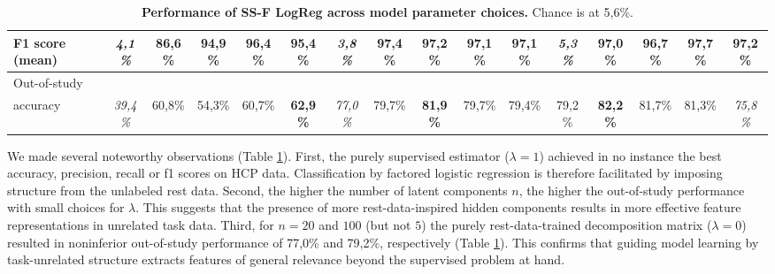 \documentclass{article} %
\begin{document}
\begin{table}[h]
{\begin{tabular}{l|ccccc|ccccc|ccccc}
  F1 score (mean)           & \textit{4,1\%}                     & 86,6\%                             & 94,9\%                            & \textbf{96,4\%}                    & 95,4\%                           & \textit{3,8\%}                   & \textbf{97,4\%}                      & 97,2\%                              & 97,1\%                               & 97,1\%                             & \textit{5,3\%}   & 97,0\%           & 96,7\%           & \textbf{97,7\%}  & 97,2\%                             \\ \hline
  Out-of-study\\accuracy    & \textit{39,4\%}                    & 60,8\%                             & 54,3\%                            & 60,7\%                             & \textbf{62,9\%}                  & \textit{77,0\%}                  & 79,7\%                               & \textbf{81,9\%}                     & 79,7\%                               & 79,4\%                             & 79,2\%           & \textbf{82,2\%}  & 81,7\%           & 81,3\%           & \textit{75,8\%}                    \\ \hline
  \end{tabular}
}
\vspace{-0.2cm}
 \caption{\textbf{Performance of SS-F LogReg across model parameter choices.}
 Chance is at 5,6\%.
 }
  \label{table_two}
\end{table}

We made several noteworthy observations (Table \ref{table_two}).
%
First, the purely supervised estimator ($\lambda=1$) achieved in no
instance the best accuracy, precision, recall or f1 scores on HCP data.
Classification by factored logistic regression is therefore facilitated by
imposing structure from the unlabeled rest data.
%
Second, the higher the number of latent components $n$,
the higher the out-of-study performance with small choices for $\lambda$.
This suggests that the presence of more rest-data-inspired hidden components
results in more effective feature representations in unrelated task data.
%
Third, for $n=20$ and $100$ (but not $5$) the purely rest-data-trained
decomposition matrix ($\lambda=0$) resulted in
noninferior out-of-study performance
of 77,0\% and 79,2\%,
respectively (Table \ref{table_two}).
This confirms that guiding model learning by task-unrelated structure
extracts features of general relevance
beyond the supervised problem at hand.

\end{document}

